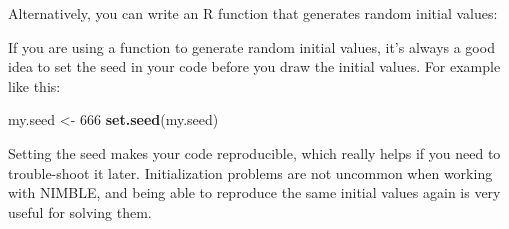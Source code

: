 \documentclass[
  12pt,
]{krantz}
\newenvironment{Shaded}{\begin{snugshade}}{\end{snugshade}}
\newcommand{\AttributeTok}[1]{\textcolor[rgb]{0.13,0.29,0.53}{#1}}
\newcommand{\ControlFlowTok}[1]{\textcolor[rgb]{0.13,0.29,0.53}{\textbf{#1}}}
\newcommand{\DecValTok}[1]{\textcolor[rgb]{0.00,0.00,0.81}{#1}}
\newcommand{\DocumentationTok}[1]{\textcolor[rgb]{0.56,0.35,0.01}{\textbf{\textit{#1}}}}
\newcommand{\FloatTok}[1]{\textcolor[rgb]{0.00,0.00,0.81}{#1}}
\newcommand{\FunctionTok}[1]{\textcolor[rgb]{0.13,0.29,0.53}{\textbf{#1}}}
\newcommand{\NormalTok}[1]{#1}
\newcommand{\OtherTok}[1]{\textcolor[rgb]{0.56,0.35,0.01}{#1}}
\begin{document}
\begin{Shaded}
\end{Shaded}

Alternatively, you can write an R function that generates random initial values:

\begin{Shaded}
\end{Shaded}

If you are using a function to generate random initial values, it's always a good idea to set the seed in your code before you draw the initial values. For example like this:

\begin{Shaded}
\begin{Highlighting}[]
\NormalTok{my.seed }\OtherTok{\textless{}{-}} \DecValTok{666}
\FunctionTok{set.seed}\NormalTok{(my.seed)}
\end{Highlighting}
\end{Shaded}

Setting the seed makes your code reproducible, which really helps if you need to trouble-shoot it later. Initialization problems are not uncommon when working with NIMBLE, and being able to reproduce the same initial values again is very useful for solving them.
\end{document}
